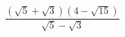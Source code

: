 \begin{ex}[type=expression]
	\begin{condition}
		\( \dfrac{(\sqrt{5}+\sqrt{3})(4-\sqrt{15})}{\sqrt{5}-\sqrt{3}} \)
	\end{condition}
\end{ex}